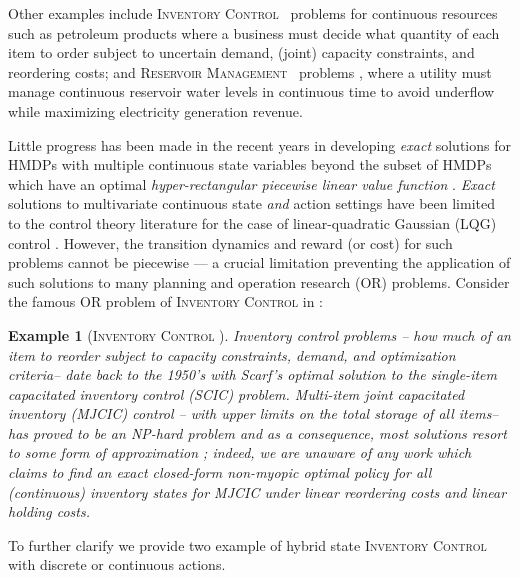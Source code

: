 \documentclass[twoside,11pt]{article}
\newcommand{\InventoryControl}{\textsc{Inventory Control }}
\newcommand{\WaterReservoir}{\textsc{Reservoir Management }}
\newtheorem*{example*}{Example}
\begin{document}
Other examples include \InventoryControl\ problems \cite{Scarf_Karlin58} for continuous resources such as petroleum products where a business must decide what quantity of each item to order subject to uncertain demand, (joint) capacity constraints, and reordering costs; and  \WaterReservoir\ problems \cite{reservoir}, where a utility must manage continuous reservoir water levels in continuous time to avoid underflow while maximizing electricity generation revenue.

Little progress has been made in the recent years in developing \emph{exact} solutions for HMDPs with multiple continuous state variables beyond the subset of HMDPs  which have an optimal \emph{hyper-rectangular piecewise linear value function} \cite{feng04,li05}. \emph{Exact} solutions to multivariate continuous state \emph{and} action settings have been limited to the control theory literature for the case of linear-quadratic Gaussian (LQG) control \cite{lqgc}. 
However, the transition dynamics and reward (or cost) for such problems cannot be piecewise --- a crucial limitation preventing the application of such solutions to many planning and operation research (OR) problems. 
Consider the famous OR problem of \InventoryControl in \cite{Scarf_Karlin58}: 
\begin{example*} [\InventoryControl]
Inventory control problems -- how much of an
item to reorder subject to capacity constraints, demand, and optimization criteria-- date back to the 1950's with Scarf's optimal solution to the \emph{single-item capacitated inventory control} (SCIC) problem.
\emph{Multi-item joint capacitated inventory (MJCIC) control} -- with upper limits
on the total storage of all items-- has proved to be an NP-hard problem and
as a consequence, most solutions resort to some form of
approximation \cite{bitran,wusd10}; indeed, we are unaware of any 
work which claims to find an exact closed-form non-myopic
optimal policy for \emph{all} (continuous) inventory states for MJCIC 
under linear reordering costs and linear holding costs.
\end{example*}

To further clarify we provide two example of hybrid state \InventoryControl with discrete or continuous actions.
\vspace{2mm}
\end{document}
